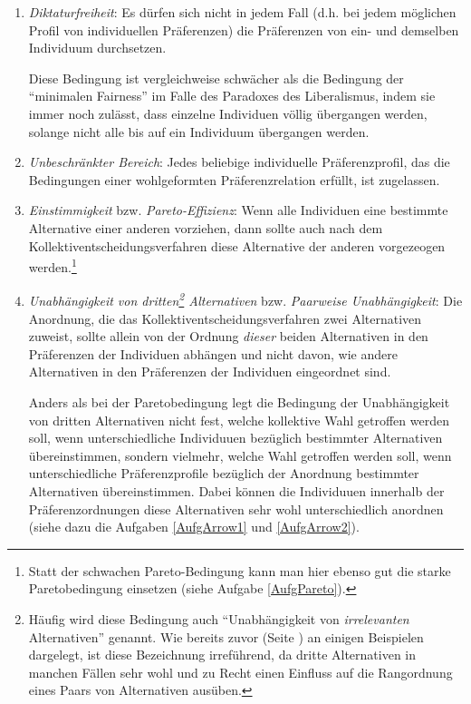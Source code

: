 \begin{enumerate}\label{ArrowVoraussetzungen}
  \item {\em Diktaturfreiheit}: Es dürfen sich nicht in jedem Fall (d.h.
  bei jedem möglichen Profil von individuellen Präferenzen)
  die Präferenzen von ein- und demselben Individuum durchsetzen.
  
  {\footnotesize Diese 
  Bedingung ist vergleichweise schwächer als die Bedingung der 
  "`minimalen Fairness"' im Falle des Paradoxes des Liberalismus, 
  indem sie immer noch zulässt, dass einzelne Individuen völlig übergangen
  werden, solange nicht alle bis auf ein Individuum übergangen werden.}
  
  \item {\em Unbeschränkter Bereich}: Jedes beliebige individuelle
  Präferenzprofil, das die Bedingungen einer wohlgeformten
  Präferenzrelation erfüllt, ist zugelassen. 

  \item {\em Einstimmigkeit} bzw. {\em Pareto-Effizienz}: Wenn alle Individuen
  eine bestimmte Alternative einer anderen vorziehen, dann sollte auch nach dem
  Kollektiventscheidungsverfahren diese Alternative der anderen vorgezeogen
  werden.\footnote{Statt der schwachen Pareto-Bedingung kann man hier ebenso gut
  die starke Paretobedingung einsetzen (siehe Aufgabe \ref{AufgPareto}).}

  \item {\em Unabhängigkeit von dritten\footnote{Häufig wird diese Bedingung auch
  "`Unabhängigkeit von {\em irrelevanten} Alternativen"' genannt. Wie bereits
  zuvor (Seite \pageref{dritteAlternativen}) an einigen Beispielen dargelegt, ist
  diese Bezeichnung irreführend, da dritte Alternativen in manchen Fällen sehr
  wohl und zu Recht einen Einfluss auf die Rangordnung eines Paars von
  Alternativen ausüben.} Alternativen} bzw. {\em Paar\-wei\-se
  Un\-ab\-häng\-ig\-keit}: Die Anordnung, die das Kollektiventscheidungsverfahren
  zwei Alternativen zuweist, sollte allein von der Ordnung {\em dieser} beiden
  Alternativen in den Präferenzen der Individuen abhängen und nicht davon, wie
  andere Alternativen in den Präferenzen der Individuen eingeordnet sind.

  {\footnotesize Anders als bei der Paretobedingung legt die Bedingung der
  Unabhängigkeit von dritten Alternativen nicht fest, welche kollektive
  Wahl getroffen werden soll, wenn unterschiedliche Individuuen bezüglich
  bestimmter Alternativen übereinstimmen, sondern vielmehr, welche Wahl
  getroffen werden soll, wenn unterschiedliche Präferenzprofile bezüglich der
  Anordnung bestimmter Alternativen übereinstimmen. Dabei können die
  Individuuen innerhalb der Präferenzordnungen diese Alternativen sehr wohl
  unterschiedlich anordnen (siehe dazu die Aufgaben \ref{AufgArrow1} und
  \ref{AufgArrow2}).}
 

\end{enumerate}
